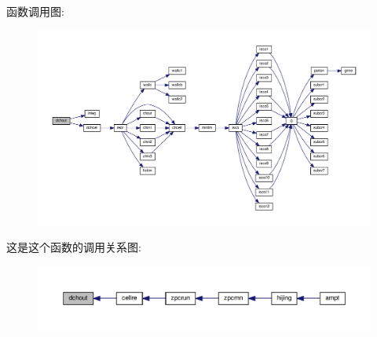 函数调用图\+:
\nopagebreak
\begin{figure}[H]
\begin{center}
\leavevmode
\includegraphics[width=350pt]{dchout_8f90_af67e6cac5eaad8f17f514d84fbb35aeb_cgraph}
\end{center}
\end{figure}
这是这个函数的调用关系图\+:
\nopagebreak
\begin{figure}[H]
\begin{center}
\leavevmode
\includegraphics[width=350pt]{dchout_8f90_af67e6cac5eaad8f17f514d84fbb35aeb_icgraph}
\end{center}
\end{figure}
